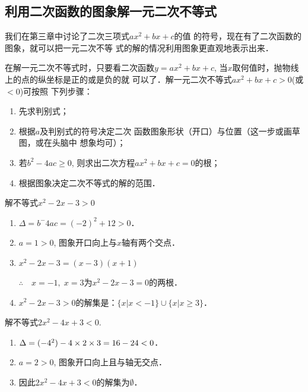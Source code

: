 \subsection{利用二次函数的图象解一元二次不等式}
我们在第三章中讨论了二次三项式$ax^2+bx+c$的值
的符号，现在有了二次函数的图象，就可以把一元二次不等
式的解的情况利用图象更直观地表示出来．

在解一元二次不等式时，只要看二次函数$y=ax^2+bx+
c$, 当$x$取何值时，抛物线上的点的纵坐标是正的或是负的就
可以了．解一元二次不等式$ax^2+bx+c>0$(或$<0$)可按照
下列步骤：
\begin{enumerate}
    \item 先求判别式；
    \item 根据$a$及判别式的符号决定二次
函数图象形状（开口）与位置（这一步或画草图，或在头脑中
想象均可）；
\item 若$b^2-4ac\ge 0$, 则求出二次方程$ax^2+bx+
c=0$的根；
\item 根据图象决定二次不等式的解的范围．
\end{enumerate}




\begin{example}
    解不等式$x^2-2x-3>0$
\end{example}

\begin{solution}
\begin{enumerate}
    \item $\Delta=b^-4ac=(-2)^2+12>0$．
    \item $a=1>0$, 图象开口向上与$x$轴有两个交点．
    \item $x^2-2x-3=(x-3)(x+1)$
    
    $\therefore\quad x=-1,\; x=3$为$x^2-2x-3=0$的两根．

    \item $x^2-2x-3>0$的解集是：$\{x|x<-1\}\cup \{x|x\ge 3\}$．
\end{enumerate}
\end{solution}

\begin{example}
解不等式$2x^2-4x+3<0$.
\end{example}

\begin{solution}
\begin{enumerate}
    \item $\Delta=(-4^2)-4\times2\times3=16-24<0$．
    \item $a=2>0$, 图象开口向上且与轴无交点．
    \item 因此$2x^2-4x+3<0$的解集为$\emptyset$．
\end{enumerate} 
\end{solution}

